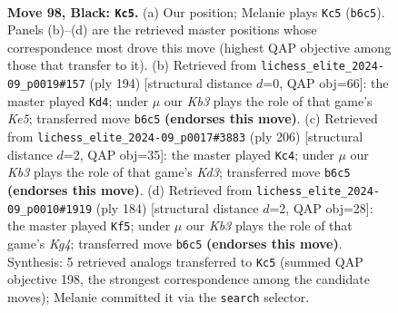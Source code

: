 \documentclass[11pt]{article}
\begin{document}
\clearpage

\begin{figure}[p]\centering
\begin{subfigure}{0.46\textwidth}\centering
\resizebox{\linewidth}{!}{%
\newchessgame
\chessboard[
  setfen={1R6/8/1k6/8/7r/r7/5K2/8 b - - 7 98},
  showmover=false,
  pgfstyle=straightmove, color=movearrow, markmove={b6-c5}
]}
\caption{}
\end{subfigure}\hfill
\begin{subfigure}{0.46\textwidth}\centering
\resizebox{\linewidth}{!}{%
\newchessgame
\chessboard[
  setfen={1R6/8/8/k3K1r1/8/8/2R5/8 w - - 15 98},
  showmover=false,
  pgfstyle=straightmove, color=movearrow, markmove={e5-d4}
]}
\caption{}
\end{subfigure}
\\[4pt]
\begin{subfigure}{0.46\textwidth}\centering
\resizebox{\linewidth}{!}{%
\newchessgame
\chessboard[
  setfen={8/3k4/1R6/8/8/3K3r/8/8 w - - 66 104},
  showmover=false,
  pgfstyle=straightmove, color=movearrow, markmove={d3-c4}
]}
\caption{}
\end{subfigure}\hfill
\begin{subfigure}{0.46\textwidth}\centering
\resizebox{\linewidth}{!}{%
\newchessgame
\chessboard[
  setfen={8/5k2/R7/8/1r4K1/8/8/8 w - - 3 93},
  showmover=false,
  pgfstyle=straightmove, color=movearrow, markmove={g4-f5}
]}
\caption{}
\end{subfigure}
\caption{\textbf{Move 98, Black: \texttt{Kc5}.} (a) Our position; Melanie plays \texttt{Kc5} (\texttt{b6c5}). Panels (b)--(d) are the retrieved master positions whose correspondence most drove this move (highest QAP objective among those that transfer to it). (b) Retrieved from \texttt{lichess\_elite\_2024-09\_p0019\#157} (ply 194) [structural distance $d$=0, QAP obj=66]: the master played \texttt{Kd4}; under $\mu$ our \emph{Kb3} plays the role of that game's \emph{Ke5}; transferred move \texttt{b6c5} \textbf{(endorses this move)}. (c) Retrieved from \texttt{lichess\_elite\_2024-09\_p0017\#3883} (ply 206) [structural distance $d$=2, QAP obj=35]: the master played \texttt{Kc4}; under $\mu$ our \emph{Kb3} plays the role of that game's \emph{Kd3}; transferred move \texttt{b6c5} \textbf{(endorses this move)}. (d) Retrieved from \texttt{lichess\_elite\_2024-09\_p0010\#1919} (ply 184) [structural distance $d$=2, QAP obj=28]: the master played \texttt{Kf5}; under $\mu$ our \emph{Kb3} plays the role of that game's \emph{Kg4}; transferred move \texttt{b6c5} \textbf{(endorses this move)}. Synthesis: 5 retrieved analogs transferred to \texttt{Kc5} (summed QAP objective 198, the strongest correspondence among the candidate moves); Melanie committed it via the \texttt{search} selector.}
\label{fig:thought-m195}
\end{figure}
\end{document}
